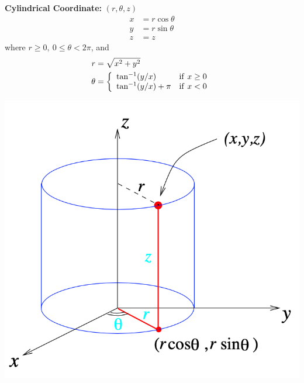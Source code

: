 \documentclass[11pt, a4paper]{MATH2023}
\begin{document}
\begin{spacing}{1.3}
    {\bf Cylindrical Coordinate:} $(r,\theta,z)$
    \begin{align*}
        x &= r\cos\theta\\ y&=r\sin\theta\\z&=z
    \end{align*}
    where $r\ge 0,\ 0\le \theta<2\pi$, and 
    \begin{align*}
        r &= \sqrt{x^2+y^2}\\
        \theta &= \left\{ \begin{array}{ll}
            \tan^{-1}(y/x) & {\rm if}\ x\ge 0\\
            \tan^{-1}(y/x)+\pi & {\rm if}\ x<0
        \end{array}\right.
    \end{align*}

    \begin{center}
        \includegraphics[scale=0.4]{images/Ch10-cylindrical-coor.png}
        \hspace{1in}

\end{center}
\end{spacing}
\end{document}
